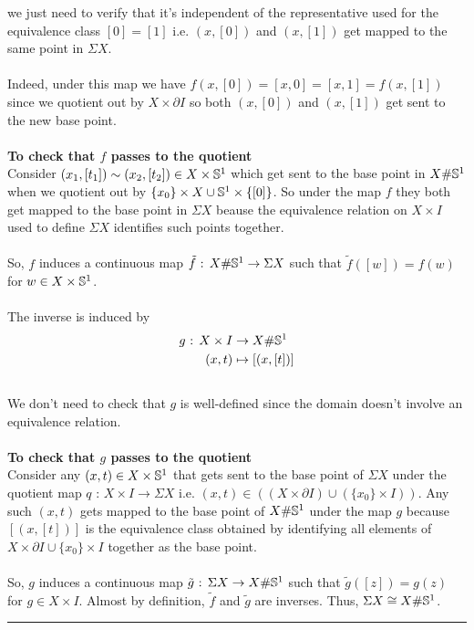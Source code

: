 \documentclass[11pt]{article}
\begin{document}
we just need to verify that it's independent of the representative used for the equivalence class $[0] = [1]$ i.e. $(x, [0])$ and $(x, [1])$ get mapped to the same point in $\Sigma X$.
\\
\\
Indeed, under this map we have $f(x, [0]) = [x, 0] = [x, 1] = f(x, [1])$ since we quotient out by $X \times \partial I$ so both $(x, [0])$ and $(x, [1])$ get sent to the new base point.
\\
\\
\textbf{To check that $f$ passes to the quotient} \\
Consider $(x_1, [t_1]) \sim (x_2, [t_2]) \in X \times \mathbb{S}^1$ which get sent to the base point in $X \# \mathbb{S}^1$ when we quotient out by $ \{x_0\} \times X \cup \mathbb{S}^1 \times \{[0]\} $. So under the map $f$ they both get mapped to the base point in $\Sigma X$ beause the equivalence relation on $X \times I$ used to define $\Sigma X$ identifies such points together.
\\
\\
So, $f$ induces a continuous map $\tilde{f} \text{ : } X \# \mathbb{S}^1 \rightarrow \Sigma X$ such that $\tilde{f}([w]) = f(w)$ for $w \in X \times \mathbb{S}^1$.
\\
\\
The inverse is induced by 
\begin{align*}
  g \text{ : } X \times I &\rightarrow X \# \mathbb{S}^1 \\
                   (x, t) &\mapsto [(x, [t])] 
\end{align*}
\\
We don't need to check that $g$ is well-defined since the domain doesn't involve an equivalence relation.
\\
\\
\textbf{To check that $g$ passes to the quotient} \\
Consider any $(x, t) \in X \times \mathbb{S}^1$ that gets sent to the base point of $\Sigma X$ under the quotient map $q \text{ : } X \times I \rightarrow \Sigma X$ i.e. $(x, t) \in ((X \times \partial I) \cup (\{x_0\} \times I))$. Any such $(x, t)$ gets mapped to the base point of $X \# \mathbb{S}^1$ under the map $g$ because $[(x, [t])]$ is the equivalence class obtained by identifying all elements of $X \times \partial I \cup \{x_0\} \times I$ together as the base point.
\\
\\
So, $g$ induces a continuous map $\tilde{g} \text{ : } \Sigma X \rightarrow X \# \mathbb{S}^1$ such that $\tilde{g}([z]) = g(z)$ for $g \in X \times I$. Almost by definition, $\tilde{f}$ and $\tilde{g}$ are inverses. Thus, $\Sigma X \cong X \# \mathbb{S}^1$.

\vskip 0.5cm
\hrule
\pagebreak

\newpage
\vskip 0.5cm

\end{document}
